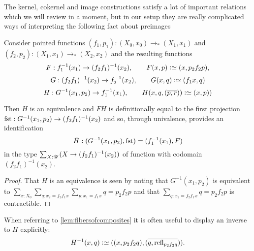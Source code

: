 The kernel, cokernel and image constructions satisfy a lot of important relations which we will review in a moment, but in our setup they are really complicated ways of interpreting the following fact about preimages
\begin{lemma}
  \label{lem:fibersofcomposites}
  Consider pointed functions $(f_1,p_1):(X_0,x_0)\to_*(X_1,x_1)$ and $(f_2,p_2):(X_1,x_1)\to_*(X_2,x_2)$ and the resulting functions
  $$F:f_1^{-1}(x_1)\to(f_2f_1)^{-1}(x_2),\qquad F(x,p)\defequi(x,p_2f_2p),$$
  $$G:(f_2f_1)^{-1}(x_2)\to f_2^{-1}(x_2),\qquad G(x,q)\defequi(f_1x,q)$$
  $$H:G^{-1}(x_1,p_2)%
  \to f_1^{-1}(x_1),\qquad H(x,q,(\overline{p,r}))\defequi (x,p))$$

Then $H$ is an equivalence and $FH$ is definitionally equal to the first projection $\fst:{G^{-1}(x_1,p_2)\to(f_2f_1)^{-1}(x_2)}$ and so, through univalence, provides an identification
  $$\bar H:(G^{-1}(x_1,p_2),\fst)=(f_1^{-1}(x_1),F)$$ in the type $\sum_{X:{\mathscr{U}}}(X\to(f_2f_1)^{-1}(x_2))$ of function with codomain $(f_2f_1)^{-1}(x_2)$.
\end{lemma}
\begin{proof}
  That $H$ is an equivalence is seen by noting that $G^{-1}(x_1,p_2)$ is equivalent to
  $\sum_{x:X_0}\sum_{q:x_2=f_2f_1x}\sum_{p:x_1=f_1x}q=p_2f_2p$ and that $\sum_{q:x_2=f_2f_1x}q=p_2f_2p$ is contractible.
\end{proof}
When referring to \cref{lem:fibersofcomposites}
it is often useful to display an inverse to $H$ explicitly:
$$H^{-1}(x,q)\defequi((x,p_2f_2q),(\overline{q,\refl{p_2f_2q}})).$$

